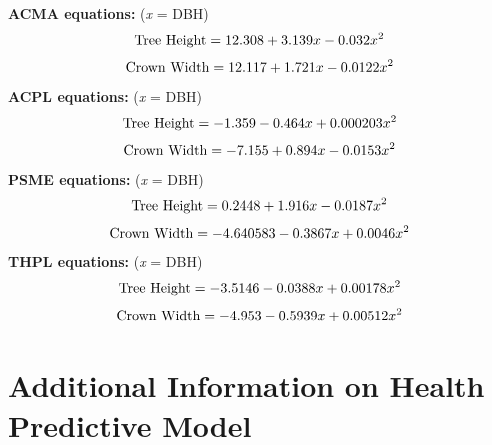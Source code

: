 \documentclass[12pt,twoside]{reedthesis}
\begin{document}
\textbf{ACMA equations:} (\textit{x} = DBH)
\begin{equation}
\textrm{Tree Height} = 12.308 + 3.139x -0.032x^{2}  \\
\label{eq:a1}
\end{equation}
\begin{equation}
\textrm{Crown Width} = 12.117 + 1.721x - 0.0122x^{2} \\
\label{eq:a2}
\end{equation}
\textbf{ACPL equations:} (\textit{x} = DBH)
\begin{equation}
\textrm{Tree Height} = -1.359 - 0.464x + 0.000203x^2 \\
\label{eq:a3}
\end{equation}
\begin{equation}
\textrm{Crown Width} = -7.155 + 0.894x - 0.0153x^2 \\
\label{eq:a4}
\end{equation}
\textbf{PSME equations:} (\textit{x} = DBH)
\begin{equation}
\textrm{Tree Height} = 0.2448 + 1.916x - 0.0187x^2 \\
\label{eq:a5}
\end{equation}
\begin{equation}
\textrm{Crown Width} = -4.640583 - 0.3867x + 0.0046x^2 \\
\label{eq:a6}
\end{equation}
\textbf{THPL equations:} (\textit{x} = DBH)
\begin{equation}
\textrm{Tree Height} = -3.5146 - 0.0388x + 0.00178x^2 \\
\label{eq:a7}
\end{equation}
\begin{equation}
\textrm{Crown Width} = -4.953 - 0.5939x + 0.00512x^2 \\
\label{eq:a8}
\end{equation}
\hypertarget{additional-information-on-health-predictive-model}{%
\section*{Additional Information on Health Predictive Model}\label{additional-information-on-health-predictive-model}}
\end{document}

